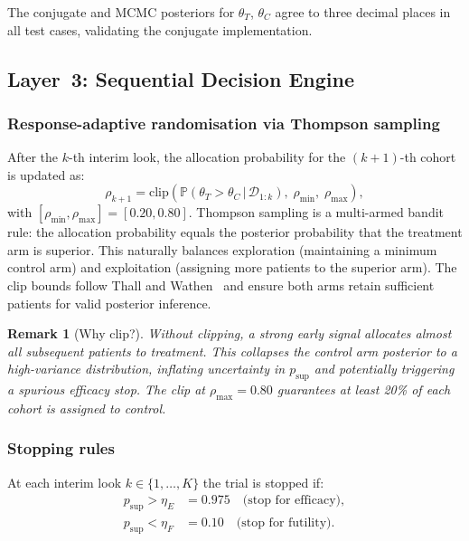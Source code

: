 \documentclass[11pt,a4paper]{article}
\newtheorem{remark}{Remark}
\newcommand{\Prob}{\mathbb{P}}
\newcommand{\given}{\,|\,}
\newcommand{\psup}{p_{\text{sup}}}
\newcommand{\thetaT}{\theta_T}
\newcommand{\thetaC}{\theta_C}
\newcommand{\etaE}{\eta_E}
\newcommand{\etaF}{\eta_F}
\begin{document}
The conjugate and MCMC posteriors for $\thetaT$, $\thetaC$ agree to three
decimal places in all test cases, validating the conjugate implementation.
 
\subsection{Layer~3: Sequential Decision Engine}
\label{sec:layer3}
 
\subsubsection{Response-adaptive randomisation via Thompson sampling}
 
After the $k$-th interim look, the allocation probability for the $(k+1)$-th
cohort is updated as:
\begin{equation}
  \label{eq:thompson}
  \rho_{k+1}
  = \mathrm{clip}\!\left(
      \Prob\!\left(\thetaT > \thetaC \given \mathcal{D}_{1:k}\right),\;
      \rho_{\min},\; \rho_{\max}
    \right),
\end{equation}
with $[\rho_{\min}, \rho_{\max}] = [0.20, 0.80]$. Thompson sampling is a
multi-armed bandit rule: the allocation probability equals the posterior
probability that the treatment arm is superior. This naturally balances
exploration (maintaining a minimum control arm) and exploitation (assigning
more patients to the superior arm). The clip bounds follow Thall and
Wathen~\cite{Thall2007} and ensure both arms retain sufficient patients for
valid posterior inference.
 
\begin{remark}[Why clip?]
Without clipping, a strong early signal allocates almost all subsequent patients
to treatment. This collapses the control arm posterior to a high-variance
distribution, inflating uncertainty in $\psup$ and potentially triggering a
spurious efficacy stop. The clip at $\rho_{\max} = 0.80$ guarantees at least
20\% of each cohort is assigned to control.
\end{remark}
 
\subsubsection{Stopping rules}
 
At each interim look $k \in \{1, \ldots, K\}$ the trial is stopped if:
\begin{align}
  \psup > \etaE &= 0.975 \quad \text{(stop for efficacy)}, \label{eq:stop-eff} \\
  \psup < \etaF &= 0.10  \quad \text{(stop for futility)}. \label{eq:stop-fut}
\end{align}
 
\end{document}
